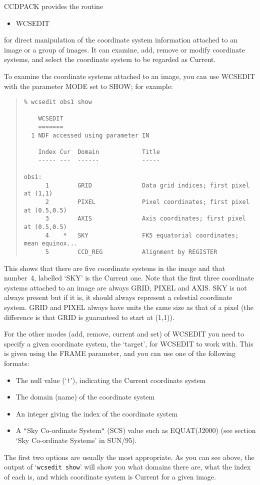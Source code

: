 \documentclass[twoside,11pt]{article}
\newcommand{\xref}[3]{#1}
\renewcommand{\_}{\texttt{\symbol{95}}}
\newenvironment{myquote}{\begin{quote}\begin{small}}{\end{small}\end{quote}}
\newcommand{\qt}[1]{{\tt "}#1{\tt "}}
\newcommand{\routine}[1]{{\sc #1}}
\begin{document}
CCDPACK provides the routine
\begin{itemize}
\item \routine{WCSEDIT}
\end{itemize}
for direct manipulation of the coordinate system information attached
to an image or a group of images.
It can examine, add, remove or modify coordinate systems, 
and select the coordinate system to be regarded as Current.

To examine the coordinate systems attached to an image, you
can use \routine{WCSEDIT} with the parameter MODE set to SHOW;
for example:
\begin{myquote}
\begin{verbatim}
% wcsedit obs1 show

    WCSEDIT
    =======
  1 NDF accessed using parameter IN

    Index Cur  Domain            Title
    ----- ---  ------            -----

obs1:
      1        GRID              Data grid indices; first pixel at (1,1)
      2        PIXEL             Pixel coordinates; first pixel at (0.5,0.5)
      3        AXIS              Axis coordinates; first pixel at (0.5,0.5)
      4    *   SKY               FK5 equatorial coordinates; mean equinox...
      5        CCD_REG           Alignment by REGISTER
\end{verbatim}
\end{myquote}
This shows that there are five coordinate systems in the image and
that number~4, labelled `SKY' is the Current one.
Note that the first three coordinate systems attached to an image
are always GRID, PIXEL and AXIS.  
SKY is not always present but if it is, it should always represent 
a celestial coordinate system.
GRID and PIXEL always have units the same size as that of a pixel
(the difference is that GRID is guaranteed to start at (1,1)). 

For the other modes (add, remove, current and set) of \routine{WCSEDIT}
you need to specify a given coordinate system,
the `target', for \routine{WCSEDIT} to work with.
This is given using the FRAME parameter, and you can use one
of the following formats:
\begin{itemize}
\item
The null value (`{\tt !}'), indicating the Current coordinate system
\item
The domain (name) of the coordinate system
\item
An integer giving the index of the coordinate system
\item
A \qt{Sky Co-ordinate System} (SCS) value such as EQUAT(J2000)
(see section \xref{`Sky Co-ordinate Systems'}{sun95}{se_scs} in 
\xref{SUN/95}{sun95}{}).
\end{itemize}
The first two options are usually the most appropriate.
As you can see above, the output of `{\tt wcsedit show}' 
will show you what domains there are, what the index of each is, 
and which coordinate system is Current for a given image.
\end{document}
